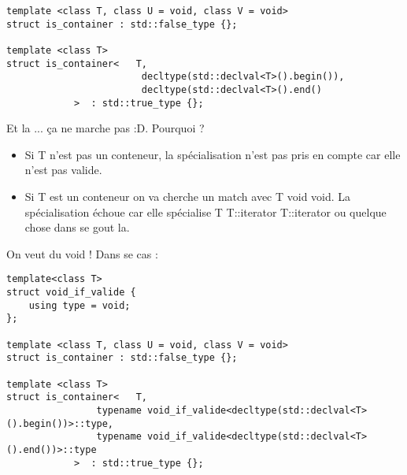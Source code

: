 \documentclass[a4paper, 11pt]{article}
\begin{document}
\begin{lstlisting}
template <class T, class U = void, class V = void>
struct is_container : std::false_type {};

template <class T>
struct is_container<   T,
                	 	decltype(std::declval<T>().begin()),
               			decltype(std::declval<T>().end()
            >  : std::true_type {};
\end{lstlisting}
Et la ... ça ne marche pas :D. Pourquoi ?
\begin{itemize}
	\item  Si T n'est pas un conteneur, la spécialisation n'est pas pris en compte car elle n'est pas valide.
	\item  Si T est un conteneur on va cherche un match avec T void void. La spécialisation échoue car elle spécialise T T::iterator  T::iterator ou quelque chose dans se gout la.
\end{itemize}
On veut du void ! Dans se cas : 
\begin{lstlisting}
template<class T>
struct void_if_valide {
    using type = void;
};

template <class T, class U = void, class V = void>
struct is_container : std::false_type {};

template <class T>
struct is_container<   T,
                typename void_if_valide<decltype(std::declval<T>().begin())>::type,
                typename void_if_valide<decltype(std::declval<T>().end())>::type
            >  : std::true_type {};
\end{lstlisting}
\end{document}
